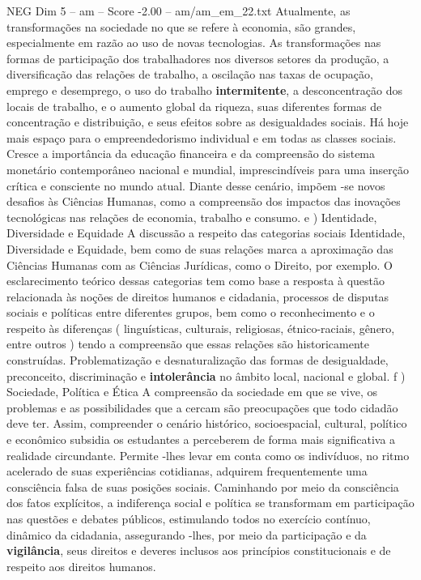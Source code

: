 \begin{textsample}{NEG Dim 5 – am – Score -2.00 – am/am\_em\_22.txt}
Atualmente, as transformações na sociedade no que se refere à economia, são grandes, especialmente em razão ao uso de novas tecnologias.
As transformações nas formas de participação dos trabalhadores nos diversos setores da produção, a diversificação das relações de trabalho, a oscilação nas taxas de ocupação, emprego e desemprego, o uso do trabalho \textbf{intermitente}, a desconcentração dos locais de trabalho, e o aumento global da riqueza, suas diferentes formas de concentração e distribuição, e seus efeitos sobre as desigualdades sociais.
Há hoje mais espaço para o empreendedorismo individual e em todas as classes sociais.
Cresce a importância da educação financeira e da compreensão do sistema monetário contemporâneo nacional e mundial, imprescindíveis para uma inserção crítica e consciente no mundo atual.
Diante desse cenário, impõem -se novos desafios às Ciências Humanas, como a compreensão dos impactos das inovações tecnológicas nas relações de economia, trabalho e consumo. e ) Identidade, Diversidade e Equidade A discussão a respeito das categorias sociais Identidade, Diversidade e Equidade, bem como de suas relações marca a aproximação das Ciências Humanas com as Ciências Jurídicas, como o Direito, por exemplo.
O esclarecimento teórico dessas categorias tem como base a resposta à questão relacionada às noções de direitos humanos e cidadania, processos de disputas sociais e políticas entre diferentes grupos, bem como o reconhecimento e o respeito às diferenças ( linguísticas, culturais, religiosas, étnico-raciais, gênero, entre outros ) tendo a compreensão que essas relações são historicamente construídas.
Problematização e desnaturalização das formas de desigualdade, preconceito, discriminação e \textbf{intolerância} no âmbito local, nacional e global. f ) Sociedade, Política e Ética A compreensão da sociedade em que se vive, os problemas e as possibilidades que a cercam são preocupações que todo cidadão deve ter.
Assim, compreender o cenário histórico, socioespacial, cultural, político e econômico subsidia os estudantes a perceberem de forma mais significativa a realidade circundante.
Permite -lhes levar em conta como os indivíduos, no ritmo acelerado de suas experiências cotidianas, adquirem frequentemente uma consciência falsa de suas posições sociais.
Caminhando por meio da consciência dos fatos explícitos, a indiferença social e política se transformam em participação nas questões e debates públicos, estimulando todos no exercício contínuo, dinâmico da cidadania, assegurando -lhes, por meio da participação e da \textbf{vigilância}, seus direitos e deveres inclusos aos princípios constitucionais e de respeito aos direitos humanos.

\end{textsample}

